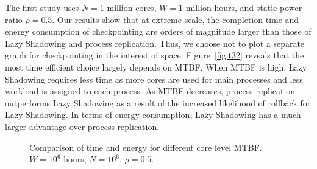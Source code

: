 The first study uses $N=1$ million cores, %
$W=1$ million hours, and static power ratio $\rho=0.5$.
Our results show that at extreme-scale, the completion time and energy consumption of checkpointing are orders of magnitude larger than those of Lazy Shadowing and process replication. Thus, we choose not to plot a separate graph for checkpointing in the interest of space. 
Figure~\ref{fig:t32} reveals that the most time efficient choice largely depends on MTBF. 
When MTBF is high, Lazy Shadowing requires less time as more cores are used for main processes and less workload is assigned to each process. As MTBF decreases, process replication outperforms Lazy Shadowing as a result of the increased likelihood of rollback for Lazy Shadowing.
In terms of energy consumption, Lazy Shadowing has a much larger advantage over process replication. %

\begin{figure}[!t]
	\begin{center} 
		\caption{Comparison of time and energy for different core level MTBF. $W=10^6$ hours, $N=10^6$, $\rho=0.5$.}
	\end{center}
	\label{fig:com3}
\end{figure}

